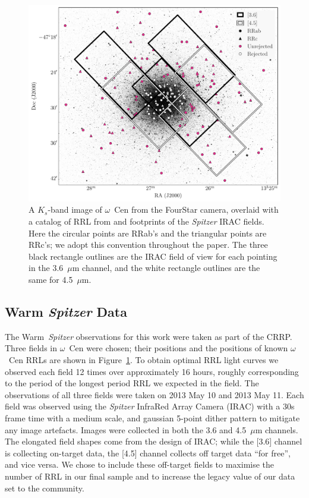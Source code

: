 \documentclass[a4paper,fleqn,usenatbib]{mnras}
\begin{document}
\begin{figure}
\begin{center}
\includegraphics[width=160mm, trim=1cm 0 1cm 0]{reworked_fitting_code/final_plots/omegacen_coverage_map_new.pdf}
\caption{A $K_s$-band image of $\omega$~Cen from the FourStar camera, overlaid with a catalog of RRL from \citet{2004A&A...424.1101K} and footprints of the {\it Spitzer} IRAC fields. Here the circular points are RRab's and the triangular points are RRc's; we adopt this convention throughout the paper. The three black rectangle outlines are the IRAC field of view for each pointing in the 3.6~$\mu$m channel, and the white rectangle outlines are the same for 4.5~$\mu$m.} 
\label{fig:omegaCen_fields}
\end{center}
\end{figure}

\subsection{Warm {\em Spitzer} Data}
\label{sec:spitzer_reduction}
The Warm~\textit{Spitzer} observations for this work were taken as part of the CRRP. Three fields in $\omega$~Cen were chosen; their positions and the positions of known $\omega$~Cen RRLs are shown in Figure~\ref{fig:omegaCen_fields}. To obtain optimal RRL light curves we observed each field 12 times over approximately 16 hours, roughly corresponding to the period of the longest period RRL we expected in the field. The observations of all three fields were taken on 2013 May 10 and 2013 May 11. Each field was observed using the {\it Spitzer} InfraRed Array Camera (IRAC) \citep{2004ApJS..154...10F} with a 30s frame time with a medium scale, and gaussian 5-point dither pattern to mitigate any image artefacts. Images were collected in both the 3.6 and 4.5~$\mu$m channels. 
The elongated field shapes come from the design of IRAC; while the [3.6] channel is collecting on-target data, the [4.5] channel collects off target data ``for free'', and vice versa. We chose to include these off-target fields to maximise the number of RRL in our final sample and to increase the legacy value of our data set to the community. 
\end{document}
